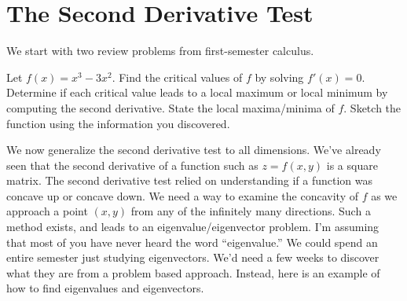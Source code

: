 \section{The Second Derivative Test}
We start with two review problems from first-semester calculus.
\begin{problem}
 Let $f(x) = x^3-3x^2$.  Find the critical values of $f$ by solving $f'(x)=0$.  Determine if each critical value leads to a local maximum or local minimum by computing the second derivative. State the local maxima/minima of $f$. Sketch the function using the information you discovered.  
\end{problem}


We now generalize the second derivative test to all dimensions. We've already seen that the second derivative of a function such as $z=f(x,y)$ is a square matrix. The second derivative test relied on understanding if a function was concave up or concave down. We need a way to examine the concavity of $f$ as we approach a point $(x,y)$ from any of the infinitely many directions. Such a method exists, and leads to an eigenvalue/eigenvector problem. I'm assuming that most of you have never heard the word ``eigenvalue.'' We could spend an entire semester just studying eigenvectors. We'd need a few weeks to discover what they are from a problem based approach.  Instead, here is an example of how to find eigenvalues and eigenvectors.


